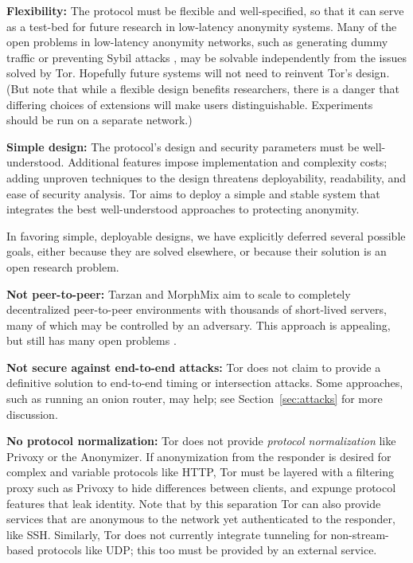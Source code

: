 \documentclass[times,10pt,twocolumn]{article}
\begin{document}
\textbf{Flexibility:} The protocol must be flexible and well-specified,
so that it can serve as a test-bed for future research in low-latency
anonymity systems.  Many of the open problems in low-latency anonymity
networks, such as generating dummy traffic or preventing Sybil attacks
\cite{sybil}, may be solvable independently from the issues solved by
Tor. Hopefully future systems will not need to reinvent Tor's design.
(But note that while a flexible design benefits researchers,
there is a danger that differing choices of extensions will make users
distinguishable. Experiments should be run on a separate network.)

\textbf{Simple design:} The protocol's design and security
parameters must be well-understood. Additional features impose implementation
and complexity costs; adding unproven techniques to the design threatens
deployability, readability, and ease of security analysis. Tor aims to
deploy a simple and stable system that integrates the best well-understood
approaches to protecting anonymity.

\label{subsec:non-goals}
In favoring simple, deployable designs, we have explicitly deferred
several possible goals, either because they are solved elsewhere, or because
their solution is an open research problem.

\textbf{Not peer-to-peer:} Tarzan and MorphMix aim to scale to completely
decentralized peer-to-peer environments with thousands of short-lived
servers, many of which may be controlled by an adversary.  This approach
is appealing, but still has many open problems
\cite{tarzan:ccs02,morphmix:fc04}.

\textbf{Not secure against end-to-end attacks:} Tor does not claim
to provide a definitive solution to end-to-end timing or intersection
attacks. Some approaches, such as running an onion router, may help;
see Section~\ref{sec:attacks} for more discussion.

\textbf{No protocol normalization:} Tor does not provide \emph{protocol
normalization} like Privoxy or the Anonymizer. If anonymization from
the responder is desired for complex and variable
protocols like HTTP, Tor must be layered with a filtering proxy such
as Privoxy to hide differences between clients, and expunge protocol
features that leak identity. 
Note that by this separation Tor can also provide services that
are anonymous to the network yet authenticated to the responder, like
SSH.
Similarly, Tor does not currently integrate
tunneling for non-stream-based protocols like UDP; this too must be
provided by an external service.
\end{document}
